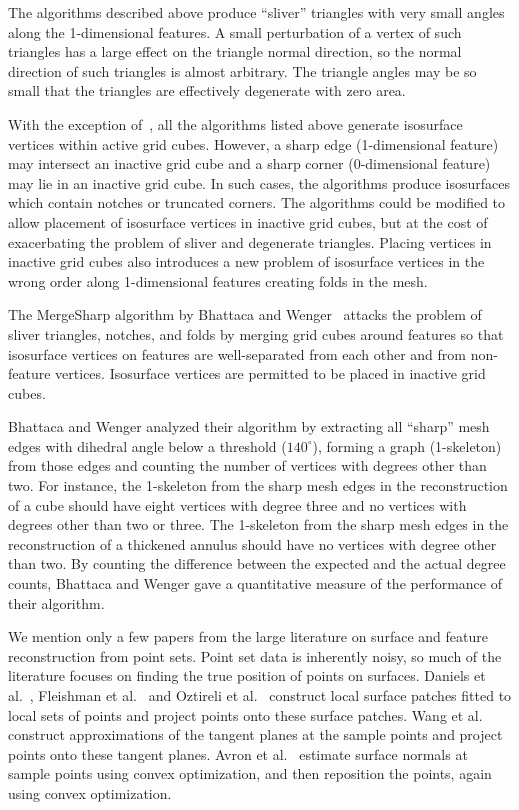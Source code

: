 The algorithms described above 
produce ``sliver'' triangles with very small angles 
along the 1-dimensional features.
A small perturbation of a vertex of such triangles
has a large effect on the triangle normal direction,
so the normal direction of such triangles is almost arbitrary.
The triangle angles may be so small that the triangles are effectively
degenerate with zero area.

With the exception of~\cite{sw-dmcpc-04},
all the algorithms listed above generate isosurface vertices
within active grid cubes.
However, a sharp edge (1-dimensional feature) may intersect 
an inactive grid cube  and a sharp corner (0-dimensional feature) 
may lie in an inactive grid cube.
In such cases, the algorithms produce isosurfaces which contain notches
or truncated corners.
The algorithms could be modified to allow placement of isosurface vertices
in inactive grid cubes,
but at the cost of exacerbating the problem 
of sliver and degenerate triangles.
Placing vertices in inactive grid cubes also introduces a new problem 
of isosurface vertices in the wrong order along 1-dimensional features
creating folds in the mesh.

The MergeSharp algorithm by Bhattaca and Wenger~\cite{bw-cisec-13,bw-erm-13}
attacks the problem of sliver triangles, notches, and folds
by merging grid cubes around features
so that isosurface vertices on features are well-separated 
from each other and from non-feature vertices.
Isosurface vertices are permitted to be placed in inactive grid cubes.

Bhattaca and Wenger analyzed their algorithm by extracting all 
``sharp'' mesh edges with dihedral angle below a threshold ($140^\circ$),
forming a graph (1-skeleton) from those edges
and counting the number of vertices with degrees other than two.
For instance, the 1-skeleton from the sharp mesh edges in the reconstruction
of a cube should have eight vertices with degree three
and no vertices with degrees other than two or three.
The 1-skeleton from the sharp mesh edges in the reconstruction
of a thickened annulus should have no vertices with degree other than two.
By counting the difference between the expected and the actual degree counts,
Bhattaca and Wenger gave a quantitative measure of the performance
of their algorithm.

We mention only a few papers from the large literature
on surface and feature reconstruction from point sets.
Point set data is inherently noisy, so much of the literature
focuses on finding the true position of points on surfaces.
Daniels et al.~\cite{Daniels:2007:Robust},
Fleishman et al.~\cite{fcs-rmlsf-2005}
and Oztireli et al.~\cite{Oztireli2009}
construct local surface patches fitted to local sets of points
and project points onto these surface patches.
Wang et al.~\cite{Wang:2013:Feature}
construct approximations of the tangent planes at the sample points
and project points onto these tangent planes.
Avron et al.~\cite{avron2010L} estimate surface normals
at sample points using convex optimization,
and then reposition the points, again using convex optimization.

